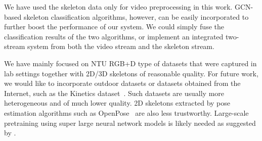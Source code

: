 \documentclass{article}
\begin{document}
{We have used the skeleton data only for video preprocessing in this work. GCN-based skeleton classification algorithms, however, can be easily incorporated to further boost the performance of our system. We could simply fuse the classification results of the two algorithms, or implement an integrated two-stream system from both the video stream and the skeleton stream.}

{We have mainly focused on NTU RGB+D type of datasets that were captured in lab settings together with 2D/3D skeletons of reasonable quality. For future work, we would like to incorporate outdoor datasets or datasets obtained from the Internet, such as the Kinetics dataset~\cite{kay2017kinetics}. Such datasets are usually more heterogeneous and of much lower quality. 2D skeletons extracted by pose estimation algorithms such as OpenPose~\cite{OpenPose} are also less trustworthy. Large-scale pretraining using super large neural network models is likely needed as suggested by \cite{duan2020omnisourced,Ghadiyaram_2019,Feichtenhofer_2019}.}










 
  

\end{document}
